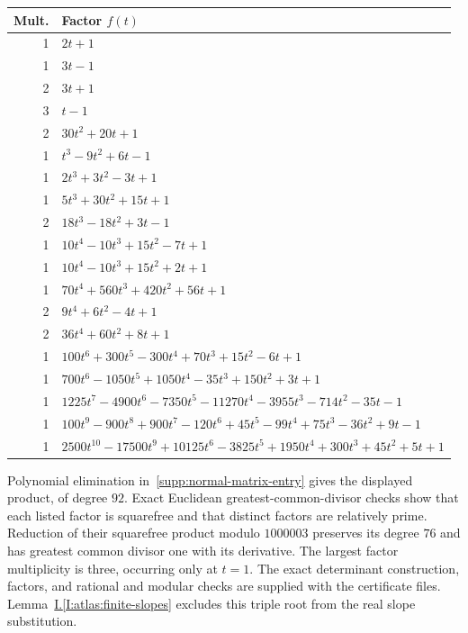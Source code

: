 \documentclass[11pt]{amsart}
\theoremstyle{definition}
\theoremstyle{remark}
\numberwithin{equation}{section}
\newcommand{\partIref}[1]{\hyperref[I:#1]{I.\ref*{I:#1}}}
\begin{document}
{\small
\begin{longtable}{r p{}}
\toprule Mult. & Factor $f(t)$ \\ \midrule \endhead
1 & $2 t + 1$ \\
1 & $3 t - 1$ \\
2 & $3 t + 1$ \\
3 & $t - 1$ \\
2 & $30 t^{2} + 20 t + 1$ \\
1 & $t^{3} - 9 t^{2} + 6 t - 1$ \\
1 & $2 t^{3} + 3 t^{2} - 3 t + 1$ \\
1 & $5 t^{3} + 30 t^{2} + 15 t + 1$ \\
2 & $18 t^{3} - 18 t^{2} + 3 t - 1$ \\
1 & $10 t^{4} - 10 t^{3} + 15 t^{2} - 7 t + 1$ \\
1 & $10 t^{4} - 10 t^{3} + 15 t^{2} + 2 t + 1$ \\
1 & $70 t^{4} + 560 t^{3} + 420 t^{2} + 56 t + 1$ \\
2 & $9 t^{4} + 6 t^{2} - 4 t + 1$ \\
2 & $36 t^{4} + 60 t^{2} + 8 t + 1$ \\
1 & $100 t^{6} + 300 t^{5} - 300 t^{4} + 70 t^{3} + 15 t^{2} - 6 t + 1$ \\
1 & $700 t^{6} - 1050 t^{5} + 1050 t^{4} - 35 t^{3} + 150 t^{2} + 3 t + 1$ \\
1 & $1225 t^{7} - 4900 t^{6} - 7350 t^{5} - 11270 t^{4} - 3955 t^{3} - 714 t^{2} - 35 t - 1$ \\
1 & $100 t^{9} - 900 t^{8} + 900 t^{7} - 120 t^{6} + 45 t^{5} - 99 t^{4} + 75 t^{3} - 36 t^{2} + 9 t - 1$ \\
1 & $2500 t^{10} - 17500 t^{9} + 10125 t^{6} - 3825 t^{5} + 1950 t^{4} + 300 t^{3} + 45 t^{2} + 5 t + 1$ \\
\bottomrule
\end{longtable}

Polynomial elimination in~\eqref{supp:normal-matrix-entry} gives the displayed product, of degree $92$. Exact Euclidean greatest-common-divisor checks show that each listed factor is squarefree and that distinct factors are relatively prime. Reduction of their squarefree product modulo $1000003$ preserves its degree $76$ and has greatest common divisor one with its derivative. The largest factor multiplicity is three, occurring only at $t=1$. The exact determinant construction, factors, and rational and modular checks are supplied with the certificate files. Lemma~\partIref{atlas:finite-slopes} excludes this triple root from the real slope substitution.
}
\end{document}
